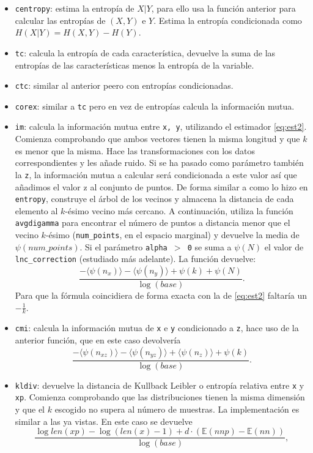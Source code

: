 \documentclass[10pt,a4paper]{article} %
\theoremstyle{definition}
\begin{document}
\begin{itemize}
\item \texttt{centropy}: estima la entropía de $X|Y$, para ello usa la función anterior para calcular las entropías de $(X,Y)$ e $Y$. Estima la entropía condicionada como $H(X|Y) = H(X,Y)-H(Y)$.
\item \texttt{tc}: calcula la entropía de cada característica, devuelve la suma de las entropías de las características menos la entropía de la variable.
\item \texttt{ctc}: similar al anterior peero con entropías condicionadas.
\item \texttt{corex}: similar a \texttt{tc} pero en vez de entropías calcula la información mutua.
\item \texttt{im}: calcula la información mutua entre \texttt{x, y}, utilizando el estimador \ref{eq:est2}. Comienza comprobando que ambos vectores tienen la misma longitud y que $k$ es menor que la misma. Hace las transformaciones con los datos correspondientes y les añade ruido. Si se ha pasado como parámetro también la  \texttt{z}, la información mutua a calcular será condicionada a este valor así que añadimos el valor z al conjunto de puntos. De forma similar a como lo hizo en \texttt{entropy}, construye el árbol de los vecinos y almacena la distancia de cada elemento al $k$-ésimo vecino más cercano. A continuación, utiliza la función \texttt{avgdigamma} para encontrar el número de puntos a distancia menor que el vecino $k$-ésimo (\texttt{num\_points}, en el espacio marginal) y devuelve la media de $\psi(num\_points)$. Si el parámetro \texttt{alpha $>$ 0} se suma a $\psi(N)$ el valor de \texttt{lnc\_correction} (estudiado más adelante). La función devuelve:\[
\frac{- \langle \psi(n_x) \rangle - \langle \psi(n_y) \rangle + \psi(k) + \psi(N)}{\log (base)}.
\]
Para que la fórmula coincidiera de forma exacta con la de \ref{eq:est2} faltaría un $-\frac{1}{k}$.
\item \texttt{cmi}: calcula la información mutua de \texttt{x} e \texttt{y} condicionado a \texttt{z}, hace uso de la anterior función, que en este caso devolvería \[
  \frac{- \langle\psi(n_{xz})\rangle - \langle\psi(n_{yz})\rangle + \langle\psi(n_z)\rangle + \psi(k)}{\log(base)}.
\]
\item \texttt{kldiv}: devuelve la distancia de Kullback Leibler o entropía relativa entre \texttt{x} y \texttt{xp}. Comienza comprobando que las distribuciones tienen la misma dimensión y que el $k$ escogido no supera al número de muestras. La implementación es similar a las ya vistas. En este caso se devuelve\[
\frac{\log len(xp) - \log(len(x) -1) + d \cdot (\mathbb{E}( nnp) - \mathbb{E} (nn))}{\log(base)},
\]


\end{itemize}
\end{document}
